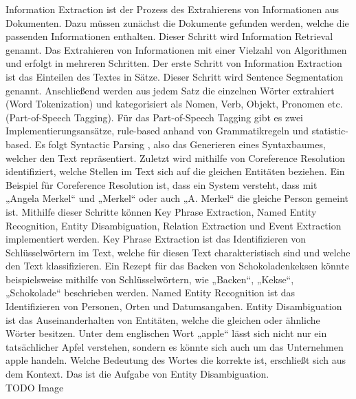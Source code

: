 Information Extraction ist der Prozess des Extrahierens von Informationen aus Dokumenten.
Dazu müssen zunächst die Dokumente gefunden werden, welche die passenden Informationen enthalten.
Dieser Schritt wird Information Retrieval genannt.
Das Extrahieren von Informationen mit einer Vielzahl von Algorithmen und erfolgt in mehreren Schritten.
Der erste Schritt von Information Extraction ist das Einteilen des Textes in Sätze.
Dieser Schritt wird Sentence Segmentation genannt.
Anschließend werden aus jedem Satz die einzelnen Wörter extrahiert (Word Tokenization) und kategorisiert als Nomen, Verb, Objekt, Pronomen etc. (Part-of-Speech Tagging).
Für das Part-of-Speech Tagging gibt es zwei Implementierungsansätze, rule-based anhand von Grammatikregeln und statistic-based.
Es folgt Syntactic Parsing , also das Generieren eines Syntaxbaumes, welcher den Text repräsentiert.
Zuletzt wird mithilfe von Coreference Resolution identifiziert, welche Stellen im Text sich auf die gleichen Entitäten beziehen.
Ein Beispiel für Coreference Resolution ist, dass ein System versteht, dass mit „Angela Merkel“ und „Merkel“ oder auch „A.
Merkel“ die gleiche Person gemeint ist.
Mithilfe dieser Schritte können Key Phrase Extraction, Named Entity Recognition, Entity Disambiguation, Relation Extraction und Event Extraction implementiert werden.
Key Phrase Extraction ist das Identifizieren von Schlüsselwörtern im Text, welche für diesen Text charakteristisch sind und welche den Text klassifizieren.
Ein Rezept für das Backen von Schokoladenkeksen könnte beispielsweise mithilfe von Schlüsselwörtern, wie „Backen“, „Kekse“, „Schokolade“ beschrieben werden.
Named Entity Recognition ist das Identifizieren von Personen, Orten und Datumsangaben.
Entity Disambiguation ist das Auseinanderhalten von Entitäten, welche die gleichen oder ähnliche Wörter besitzen.
Unter dem englischen Wort „apple“ lässt sich nicht nur ein tatsächlicher Apfel verstehen, sondern es könnte sich auch um das Unternehmen apple handeln.
Welche Bedeutung des Wortes die korrekte ist, erschließt sich aus dem Kontext.
Das ist die Aufgabe von Entity Disambiguation.\\

TODO Image\\


